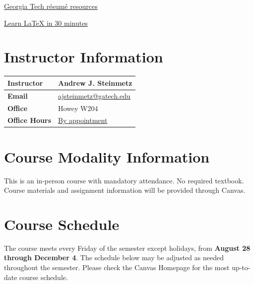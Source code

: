 \documentclass[11pt]{article}
\begin{document}
\href{https://career.gatech.edu/resumes/}{Georgia Tech r\'esum\'e resources}

\href{https://www.overleaf.com/learn/latex/Learn_LaTeX_in_30_minutes}{Learn \LaTeX{} in 30 minutes}

\section*{Instructor Information}

\begin{tabularx}{\textwidth}{>{\bfseries}p{} X}
\toprule
Instructor & Andrew J. Steinmetz \\
\midrule
Email & \href{mailto:ajsteinmetz@gatech.edu}{ajsteinmetz@gatech.edu} \\
\midrule
Office & Howey W204 \\
\midrule
Office Hours & \href{https://outlook.office.com/bookwithme/user/118287044b844adb8cb5cfaadd54546f@gatech.edu?anonymous\&ismsaljsauthenabled\&ep=plink}{By appointment} \\
\bottomrule
\end{tabularx}

\newpage

\section*{Course Modality Information}

This is an in-person course with mandatory attendance. No required textbook. Course materials and assignment information will be provided through Canvas.

\section*{Course Schedule}

The course meets every Friday of the semester except holidays, from \textbf{August 28 through December 4}. The schedule below may be adjusted as needed throughout the semester. Please check the {Canvas Homepage} for the most up-to-date course schedule.
\end{document}
